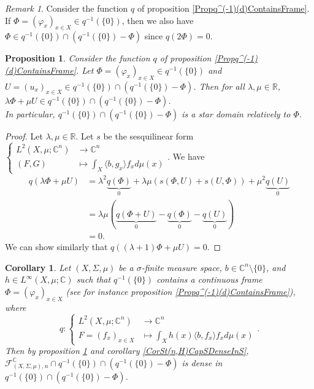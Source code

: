 \documentclass[a4paper,12pt]{article}
\theoremstyle{plain}
\newtheorem{proposition}{Proposition}[section]
\newtheorem{corollary}{Corollary}[section]
\theoremstyle{definition}
\theoremstyle{remark}
\newtheorem{remark}{Remark}[section]
\begin{document}
\begin{remark}
Consider the function $q$ of proposition \ref{Propq^(-1)(d)ContainsFrame}. If $\Phi = (\varphi_x)_{x \in X} \in q^{-1}(\{0\})$, then we also have $\Phi \in q^{-1}(\{0\}) \cap (q^{-1}(\{0\}) - \Phi)$ since $q(2\Phi)=0$.
\end{remark}

\begin{proposition}
\label{Propq-1(0)Cap(q-1(0)-Phi)PolynomialPathConnected}
Consider the function $q$ of proposition \ref{Propq^(-1)(d)ContainsFrame}. Let $\Phi = (\varphi_x)_{x \in X} \in q^{-1}(\{0\})$ and $U = (u_x)_{x \in X} \in q^{-1}(\{0\}) \cap (q^{-1}(\{0\}) - \Phi)$. Then for all $\lambda,\mu \in \mathbb{R}$, $\lambda \Phi + \mu U \in q^{-1}(\{0\}) \cap (q^{-1}(\{0\}) - \Phi)$. \\
In particular,  $q^{-1}(\{0\}) \cap (q^{-1}(\{0\}) - \Phi)$ is a star domain relatively to $\Phi$.
\end{proposition}

\begin{proof}
Let $\lambda,\mu \in \mathbb{R}$. Let $s$ be the sesquilinear form $\begin{cases} L^2(X,\mu;\mathbb{C}^n) &\to \mathbb{C}^n \\ (F,G) &\mapsto \int_X \langle b , g_x \rangle f_x d\mu(x) \end{cases}$. We have
\begin{align*} 
q(\lambda \Phi + \mu U) &= \lambda^2 \underbrace{q(\Phi)}_{0} + \lambda \mu ( s(\Phi,U) + s(U,\Phi)) + \mu^2 \underbrace{q(U)}_{0} \\
&= \lambda \mu (\underbrace{q(\Phi+U)}_{0} - \underbrace{q(\Phi)}_{0} - \underbrace{q(U)}_{0}) \\
&= 0.
\end{align*}
We can show similarly that $q((\lambda+1)\Phi + \mu U)=0$.
\end{proof}

\begin{corollary}
Let $(X,\Sigma,\mu)$ be a $\sigma$-finite measure space, $b \in \mathbb{C}^n \setminus \{0\}$, and $h \in L^\infty(X,\mu;\mathbb{C})$ such that $q^{-1}(\{0\})$ contains a continuous frame $\Phi = (\varphi_x)_{x \in X}$ (see for instance proposition \ref{Propq^(-1)(d)ContainsFrame}), where 
\[ q : \begin{cases} L^2(X,\mu;\mathbb{C}^n) &\to \mathbb{C}^n \\ F = (f_x)_{x \in X} &\mapsto \int_X h(x) \langle b , f_x \rangle f_x d\mu(x) \end{cases}. \]
Then by proposition \ref{Propq-1(0)Cap(q-1(0)-Phi)PolynomialPathConnected} and corollary \ref{CorSt(n,H)CapSDenseInS}, $\mathcal{F}_{(X,\Sigma,\mu),n}^\mathbb{C} \cap q^{-1}(\{0\}) \cap (q^{-1}(\{0\}) - \Phi)$ is dense in $q^{-1}(\{0\}) \cap (q^{-1}(\{0\}) - \Phi)$.
\end{corollary}
\end{document}

